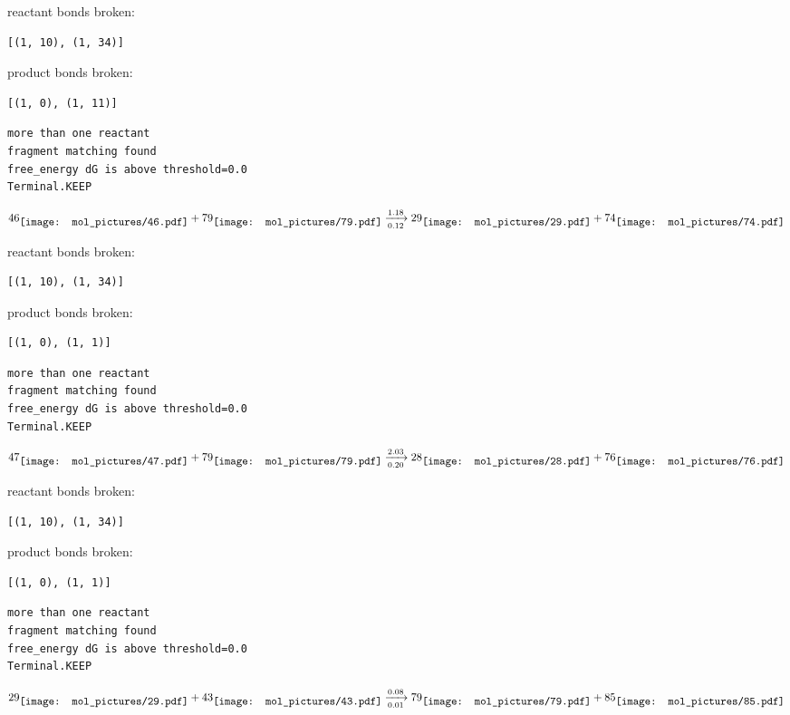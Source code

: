 \documentclass{article}
\begin{document}
reactant bonds broken:\begin{verbatim}
[(1, 10), (1, 34)]
\end{verbatim}
product bonds broken:\begin{verbatim}
[(1, 0), (1, 11)]
\end{verbatim}




\vspace{1cm}
\begin{verbatim}
more than one reactant
fragment matching found
free_energy dG is above threshold=0.0
Terminal.KEEP
\end{verbatim}
$$
46
\raisebox{-.5\height}{\texttt{[image: mol\_pictures/46.pdf]}}
+
79
\raisebox{-.5\height}{\texttt{[image: mol\_pictures/79.pdf]}}
\xrightarrow[0.12]{1.18}
29
\raisebox{-.5\height}{\texttt{[image: mol\_pictures/29.pdf]}}
+
74
\raisebox{-.5\height}{\texttt{[image: mol\_pictures/74.pdf]}}
$$


reactant bonds broken:\begin{verbatim}
[(1, 10), (1, 34)]
\end{verbatim}
product bonds broken:\begin{verbatim}
[(1, 0), (1, 1)]
\end{verbatim}




\vspace{1cm}
\begin{verbatim}
more than one reactant
fragment matching found
free_energy dG is above threshold=0.0
Terminal.KEEP
\end{verbatim}
$$
47
\raisebox{-.5\height}{\texttt{[image: mol\_pictures/47.pdf]}}
+
79
\raisebox{-.5\height}{\texttt{[image: mol\_pictures/79.pdf]}}
\xrightarrow[0.20]{2.03}
28
\raisebox{-.5\height}{\texttt{[image: mol\_pictures/28.pdf]}}
+
76
\raisebox{-.5\height}{\texttt{[image: mol\_pictures/76.pdf]}}
$$


reactant bonds broken:\begin{verbatim}
[(1, 10), (1, 34)]
\end{verbatim}
product bonds broken:\begin{verbatim}
[(1, 0), (1, 1)]
\end{verbatim}




\vspace{1cm}
\begin{verbatim}
more than one reactant
fragment matching found
free_energy dG is above threshold=0.0
Terminal.KEEP
\end{verbatim}
$$
29
\raisebox{-.5\height}{\texttt{[image: mol\_pictures/29.pdf]}}
+
43
\raisebox{-.5\height}{\texttt{[image: mol\_pictures/43.pdf]}}
\xrightarrow[0.01]{0.08}
79
\raisebox{-.5\height}{\texttt{[image: mol\_pictures/79.pdf]}}
+
85
\raisebox{-.5\height}{\texttt{[image: mol\_pictures/85.pdf]}}
$$
\end{document}
